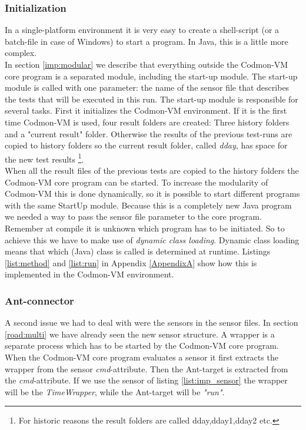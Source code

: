\documentclass{article}
\newcommand{\project}{Codmon-VM}
\begin{document}
\subsubsection{Initialization}
\label{imp:start}
In a single-platform environment it is very easy to create a shell-script (or a batch-file in case of Windows) to start a program. In Java, this is a little more complex.\\

\noindent In section \ref{imp:modular} we describe that everything outside the \project{} core program is a separated module, including the start-up module. The start-up module is called with one parameter: 
the name of the sensor file that describes the tests that will be executed in this run. The start-up module is responsible for several tasks. First it initializes the \project{} environment. If it is the 
first time \project{} is used, four result folders are created: Three history folders and a "current result" folder. Otherwise the results of the previous test-runs are copied to history folders so the 
current result folder, called \emph{dday}, has space for the new test results \footnote{For historic reasons the result folders are called dday,dday1,dday2 etc.}.\\

\noindent When all the result files of the previous tests are copied to the history folders the \project{} core program can be started. To increase the modularity of \project{} this is done dynamically, so 
it is possible to start different programs with the same StartUp module. Because this is a completely new Java program we needed a way to pass the sensor file parameter to the core program. Remember at 
compile it is unknown which program has to be initiated. So to achieve this we have to make use of \emph{dynamic class loading}. Dynamic class loading means that which (Java) class is called is determined 
at runtime. Listings \ref{list:method} and \ref{list:run} in Appendix \ref{AppendixA} show how this is implemented in the \project{} environment.


\subsubsection{Ant-connector}
\label{imp:ant}
A second issue we had to deal with were the sensors in the sensor files. In section \ref{road:multi} we have already seen the new sensor structure. A wrapper is a separate process which has to be started by 
the \project{} core program.  When the \project{} core program evaluates a sensor it first extracts the wrapper from the sensor \emph{cmd}-attribute. Then the Ant-target is extracted from the 
\emph{cmd}-attribute. If we use the sensor of listing \ref{list:imp_sensor} the wrapper will be the \emph{TimeWrapper}, while the Ant-target will be \emph{"run"}.\\
\end{document}
